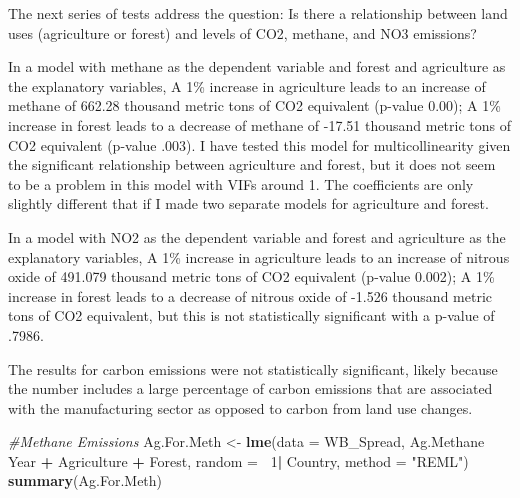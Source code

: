 \documentclass[12pt,]{article}
\newenvironment{Shaded}{\begin{snugshade}}{\end{snugshade}}
\newcommand{\KeywordTok}[1]{\textcolor[rgb]{0.13,0.29,0.53}{\textbf{#1}}}
\newcommand{\DataTypeTok}[1]{\textcolor[rgb]{0.13,0.29,0.53}{#1}}
\newcommand{\DecValTok}[1]{\textcolor[rgb]{0.00,0.00,0.81}{#1}}
\newcommand{\StringTok}[1]{\textcolor[rgb]{0.31,0.60,0.02}{#1}}
\newcommand{\CommentTok}[1]{\textcolor[rgb]{0.56,0.35,0.01}{\textit{#1}}}
\newcommand{\OperatorTok}[1]{\textcolor[rgb]{0.81,0.36,0.00}{\textbf{#1}}}
\newcommand{\NormalTok}[1]{#1}
\begin{document}
The next series of tests address the question: Is there a relationship
between land uses (agriculture or forest) and levels of CO2, methane,
and NO3 emissions?

In a model with methane as the dependent variable and forest and
agriculture as the explanatory variables, A 1\% increase in agriculture
leads to an increase of methane of 662.28 thousand metric tons of CO2
equivalent (p-value 0.00); A 1\% increase in forest leads to a decrease
of methane of -17.51 thousand metric tons of CO2 equivalent (p-value
.003). I have tested this model for multicollinearity given the
significant relationship between agriculture and forest, but it does not
seem to be a problem in this model with VIFs around 1. The coefficients
are only slightly different that if I made two separate models for
agriculture and forest.

In a model with NO2 as the dependent variable and forest and agriculture
as the explanatory variables, A 1\% increase in agriculture leads to an
increase of nitrous oxide of 491.079 thousand metric tons of CO2
equivalent (p-value 0.002); A 1\% increase in forest leads to a decrease
of nitrous oxide of -1.526 thousand metric tons of CO2 equivalent, but
this is not statistically significant with a p-value of .7986.

The results for carbon emissions were not statistically significant,
likely because the number includes a large percentage of carbon
emissions that are associated with the manufacturing sector as opposed
to carbon from land use changes.

\begin{Shaded}
\begin{Highlighting}[]
\CommentTok{#Methane Emissions}
\NormalTok{Ag.For.Meth <-}\StringTok{ }\KeywordTok{lme}\NormalTok{(}\DataTypeTok{data =}\NormalTok{ WB_Spread,}
\NormalTok{                 Ag.Methane }\OperatorTok{~}\StringTok{ }\NormalTok{Year }\OperatorTok{+}\StringTok{ }\NormalTok{Agriculture }\OperatorTok{+}\StringTok{ }\NormalTok{Forest,}
                 \DataTypeTok{random =} \OperatorTok{~}\DecValTok{1}\OperatorTok{|}\StringTok{ }\NormalTok{Country,}
                 \DataTypeTok{method =} \StringTok{"REML"}\NormalTok{)}
\KeywordTok{summary}\NormalTok{(Ag.For.Meth)}
\end{Highlighting}
\end{Shaded}
\end{document}
